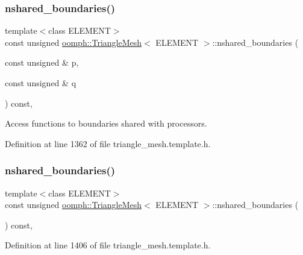 \subsubsection{\texorpdfstring{nshared\+\_\+boundaries()}{nshared\_boundaries()}\hspace{0.1cm}{\footnotesize\ttfamily [1/2]}}
{\footnotesize\ttfamily template$<$class E\+L\+E\+M\+E\+NT$>$ \\
const unsigned \hyperlink{classoomph_1_1TriangleMesh}{oomph\+::\+Triangle\+Mesh}$<$ E\+L\+E\+M\+E\+NT $>$\+::nshared\+\_\+boundaries (\begin{DoxyParamCaption}\item[{const unsigned \&}]{p,  }\item[{const unsigned \&}]{q }\end{DoxyParamCaption}) const\hspace{0.3cm}{\ttfamily [inline]}, {\ttfamily [protected]}}



Access functions to boundaries shared with processors. 



Definition at line 1362 of file triangle\+\_\+mesh.\+template.\+h.

\mbox{\label{classoomph_1_1TriangleMesh_a9822d783f9ffbdfb2553d241ac18f20a}} 
\subsubsection{\texorpdfstring{nshared\+\_\+boundaries()}{nshared\_boundaries()}\hspace{0.1cm}{\footnotesize\ttfamily [2/2]}}
{\footnotesize\ttfamily template$<$class E\+L\+E\+M\+E\+NT$>$ \\
const unsigned \hyperlink{classoomph_1_1TriangleMesh}{oomph\+::\+Triangle\+Mesh}$<$ E\+L\+E\+M\+E\+NT $>$\+::nshared\+\_\+boundaries (\begin{DoxyParamCaption}{ }\end{DoxyParamCaption}) const\hspace{0.3cm}{\ttfamily [inline]}, {\ttfamily [protected]}}



Definition at line 1406 of file triangle\+\_\+mesh.\+template.\+h.

